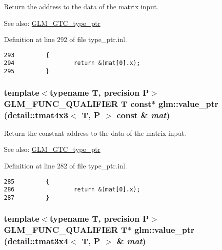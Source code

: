 Return the address to the data of the matrix input. \begin{Desc}
\item[See also:]\hyperlink{group__gtc__type__ptr}{GLM\_\-GTC\_\-type\_\-ptr} \end{Desc}


Definition at line 292 of file type\_\-ptr.inl.

\begin{Code}\begin{verbatim}293         {
294                 return &(mat[0].x);
295         }
\end{verbatim}
\end{Code}


\hypertarget{group__gtc__type__ptr_g7c8877c9dc37f2229d4b75fd735be5d5}{
\subsubsection[value\_\-ptr]{\setlength{\rightskip}{0pt plus 5cm}template$<$typename T, precision P$>$ GLM\_\-FUNC\_\-QUALIFIER T const$\ast$ glm::value\_\-ptr (detail::tmat4x3$<$ T, P $>$ const \& {\em mat})}}
\label{group__gtc__type__ptr_g7c8877c9dc37f2229d4b75fd735be5d5}


Return the constant address to the data of the matrix input. \begin{Desc}
\item[See also:]\hyperlink{group__gtc__type__ptr}{GLM\_\-GTC\_\-type\_\-ptr} \end{Desc}


Definition at line 282 of file type\_\-ptr.inl.

\begin{Code}\begin{verbatim}285         {
286                 return &(mat[0].x);
287         }
\end{verbatim}
\end{Code}


\hypertarget{group__gtc__type__ptr_gf7f8f1087650774da27f31c99175cfeb}{
\subsubsection[value\_\-ptr]{\setlength{\rightskip}{0pt plus 5cm}template$<$typename T, precision P$>$ GLM\_\-FUNC\_\-QUALIFIER T$\ast$ glm::value\_\-ptr (detail::tmat3x4$<$ T, P $>$ \& {\em mat})}}
\label{group__gtc__type__ptr_gf7f8f1087650774da27f31c99175cfeb}


